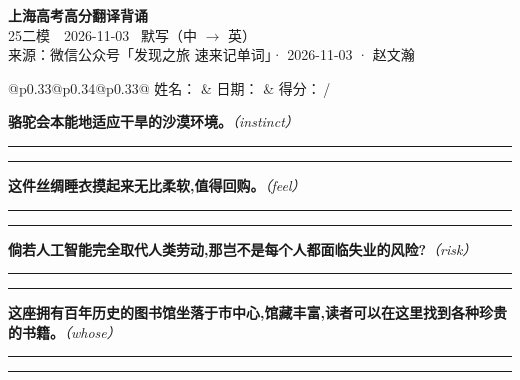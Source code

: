 \documentclass[11pt,a4paper]{article}
\newcommand{\num}[1]{\makebox[1.9em][r]{#1.}\hspace{0.3em}}
\newcommand{\wline}{\noindent\rule{\linewidth}{0.4pt}}
\newcommand{\prompt}[1]{\emph{\textcolor{tipblue}{\small（#1）}}}
\begin{document}
\pagestyle{plain}
\begin{center}
{\LARGE\bfseries 上海高考高分翻译背诵 }\\[0.25em]
{\large 25二模　2026-11-03 \quad\ 默写（中 $\to$ 英）}\\[0.35em]
{\footnotesize 来源：微信公众号「发现之旅 速来记单词」· 2026-11-03 · 赵文瀚}
\end{center}

\vspace{0.4em}
\noindent\begin{tabular}{@{}p{0.33\textwidth}@{}p{0.34\textwidth}@{}p{0.33\textwidth}@{}}
姓名：\underline{\hspace{2.0cm}} & 日期：\underline{\hspace{2.0cm}} & 得分：\underline{\hspace{1.4cm}}\,/ \\
\end{tabular}

\vspace{0.5em}

\vspace{0.8em}
\num{1}\textbf{骆驼会本能地适应干旱的沙漠环境。}\prompt{instinct}

\vspace{0.3em}

\wline\vspace{0.3em}
\wline

\num{2}\textbf{这件丝绸睡衣摸起来无比柔软,值得回购。}\prompt{feel}

\vspace{0.3em}

\wline\vspace{0.3em}
\wline

\num{3}\textbf{倘若人工智能完全取代人类劳动,那岂不是每个人都面临失业的风险?}\prompt{risk}

\vspace{0.3em}

\wline\vspace{0.3em}
\wline

\num{4}\textbf{这座拥有百年历史的图书馆坐落于市中心,馆藏丰富,读者可以在这里找到各种珍贵的书籍。}\prompt{whose}

\vspace{0.3em}

\wline\vspace{0.3em}
\wline
\end{document}
